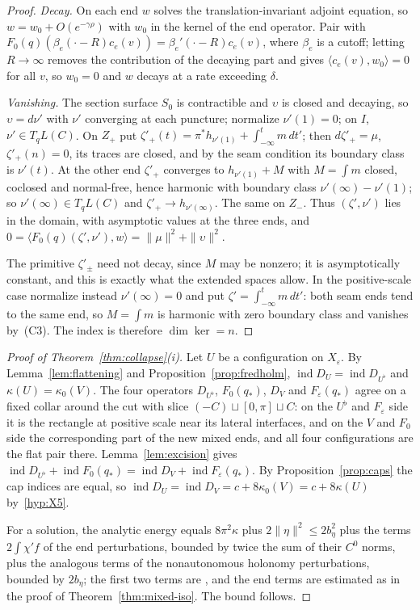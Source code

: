 \documentclass[11pt]{amsart}
\theoremstyle{definition}
\theoremstyle{remark}
\theoremstyle{plain}
\numberwithin{equation}{section}
\newcommand{\ind}{\operatorname{ind}}
\newcommand{\eps}{\varepsilon}
\begin{document}
\begin{proof}
\emph{Decay.} On each end $w$ solves the translation-invariant adjoint
equation, so $w=w_0+O(e^{-\gamma\rho})$ with $w_0$ in the kernel of the end
operator. Pair with $F_0(q)(\beta_e(\cdot-R)c_e(v))=\beta_e'(\cdot-R)c_e(v)$, where
$\beta_e$ is a cutoff; letting $R\to\infty$ removes the contribution of the
decaying part and gives $\langle c_e(v),w_0\rangle=0$ for all $v$, so $w_0=0$ and $w$
decays at a rate exceeding $\delta$.

\emph{Vanishing.} The section surface $S_0$ is contractible and $\upsilon$ is
closed and decaying, so $\upsilon=d\nu'$ with $\nu'$ converging at each puncture;
normalize $\nu'(1)=0$; on $I$, $\nu'\in T_qL(C)$. On $Z_+$ put
$\zeta'_+(t)=\pi^*h_{\nu'(1)}+\int_{-\infty}^tm\,dt'$; then $d\zeta'_+=\mu$,
$\zeta'_+(n)=0$, its traces are closed, and by the seam condition its
boundary class is $\nu'(t)$. At the other end $\zeta'_+$ converges to
$h_{\nu'(1)}+M$ with $M=\int m$ closed, coclosed and normal-free, hence
harmonic with boundary class $\nu'(\infty)-\nu'(1)$; so
$\nu'(\infty)\in T_qL(C)$ and $\zeta'_+\to h_{\nu'(\infty)}$. The same on
$Z_-$. Thus $(\zeta',\nu')$ lies in the domain, with asymptotic values at the three ends, and $0=\langle F_0(q)(\zeta',\nu'),w\rangle=\|\mu\|^2+\|\upsilon\|^2$.

The primitive $\zeta'_\pm$ need not decay, since $M$ may be nonzero; it is
asymptotically constant, and this is exactly what the extended spaces allow. In the positive-scale case normalize instead $\nu'(\infty)=0$ and put
$\zeta'=\int_{-\infty}^tm\,dt'$: both seam ends tend to the same end, so $M=\int m$ is
harmonic with zero boundary class and vanishes by~(C3).
The index is therefore $\dim\ker=n$.
\end{proof}

\begin{proof}[Proof of Theorem~\ref{thm:collapse}(i)]
Let $U$ be a configuration on $X_\eps$. By Lemma~\ref{lem:flattening} and
Proposition~\ref{prop:fredholm}, $\ind D_U=\ind D_{U^\flat}$ and
$\kappa(U)=\kappa_0(V)$. The four operators $D_{U^\flat}$, $F_0(q_*)$,
$D_V$ and $F_\eps(q_*)$ agree on a fixed collar around the cut with slice
$(-C)\sqcup[0,\pi]\sqcup C$: on the $U^\flat$ and $F_\eps$ side it is the
rectangle at positive scale near its lateral interfaces, and on the $V$
and $F_0$ side the corresponding part of the new mixed ends, and all four
configurations are the flat pair there. Lemma~\ref{lem:excision} gives
$\ind D_{U^\flat}+\ind F_0(q_*)=\ind D_V+\ind F_\eps(q_*)$. By
Proposition~\ref{prop:caps} the cap indices are equal, so
$\ind D_U=\ind D_V=c+8\kappa_0(V)=c+8\kappa(U)$ by~\ref{hyp:X5}.

For a solution, the analytic energy equals $8\pi^2\kappa$ plus
$2\|\eta\|^2\le2b_\eta^2$ plus the terms $2\int\chi'f$ of the end perturbations,
bounded by twice the sum of their $C^0$ norms, plus the analogous terms of the nonautonomous
holonomy perturbations, bounded by $2b_\eta$; the first two terms are
\cite[(3.24)]{DFL}, and the end terms are estimated as in the proof
of Theorem~\ref{thm:mixed-iso}.
The bound follows.
\end{proof}
\end{document}
